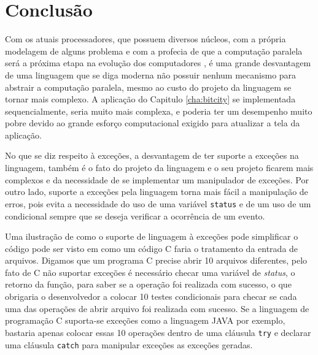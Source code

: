 \chapter{Conclusão}
\label{chap:conclusao}

Com os atuais processadores, que possuem diversos núcleos, com a própria
modelagem de alguns problema e com a profecia de que a computação paralela
será a próxima etapa na evolução dos computadores \cite{TM}, é uma grande
desvantagem de uma linguagem que se diga moderna não possuir nenhum
mecanismo para abstrair a computação paralela, mesmo ao custo do projeto da
linguagem se tornar mais complexo. A aplicação do Capitulo
\ref{cha:bitcity} se implementada sequencialmente, seria muito mais
complexa, e poderia ter um desempenho muito pobre devido ao grande esforço
computacional exigido para atualizar a tela da aplicação.

No que se diz respeito à exceções, a desvantagem de ter suporte a
exceções na linguagem, também é o fato do projeto da linguagem e o seu projeto
ficarem mais complexos e da necessidade de se implementar um manipulador
de exceções. Por outro lado, suporte a exceções pela linguagem torna
mais fácil a manipulação de erros, pois evita a necessidade do uso de
uma variável \texttt{status} e de um uso de um condicional sempre que se
deseja verificar a ocorrência de um evento.

Uma ilustração de como o suporte de linguagem à exceções pode simplificar
o código pode ser visto em como um código C faria o tratamento da entrada de
arquivos. Digamos que um programa C precise abrir 10 arquivos diferentes, pelo
fato de C não suportar exceções é necessário checar uma variável de {\it
status}, o retorno da função, para saber se a operação foi realizada com
sucesso, o que obrigaria o desenvolvedor a colocar 10 testes condicionais para
checar se cada uma das operações de abrir arquivo foi realizada com
sucesso. Se a linguagem de programação C suporta-se exceções como a
linguagem JAVA por exemplo, bastaria apenas colocar essas 10 operações
dentro de uma cláusula \texttt{try} e declarar uma cláusula \texttt{catch}
para manipular exceções as exceções geradas.
